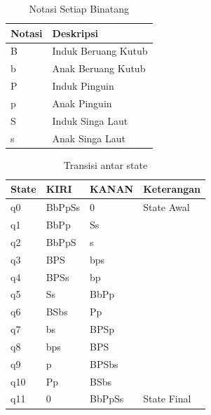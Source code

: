 \documentclass[12pt,a4paper]{article}
\begin{document}
\begin{table}[H]
\centering
\begin{tabular}{@{}ll@{}}
\toprule
\textbf{Notasi} & \textbf{Deskripsi} \\ \midrule
B & Induk Beruang Kutub \\
b & Anak Beruang Kutub \\
P & Induk Pinguin \\
p & Anak Pinguin \\
S & Induk Singa Laut \\
s & Anak Singa Laut \\ \bottomrule
\end{tabular}
\caption{Notasi Setiap Binatang}
\label{tab:notasi-binatang}
\end{table}

\begin{table}[h!]
\centering
\begin{tabular}{@{}llll@{}}
\toprule
\textbf{State} & \textbf{KIRI} & \textbf{KANAN} & \textbf{Keterangan} \\ \midrule
q0 & BbPpSs & 0        & State Awal    \\
q1 & BbPp   & Ss       &               \\
q2 & BbPpS  & s        &               \\
q3 & BPS    & bps      &               \\
q4 & BPSs   & bp       &               \\
q5 & Ss     & BbPp     &               \\
q6 & BSbs   & Pp       &               \\
q7 & bs     & BPSp     &               \\
q8 & bps    & BPS      &               \\
q9 & p      & BPSbs    &               \\
q10 & Pp    & BSbs     &               \\
q11 & 0     & BbPpSs   & State Final   \\ \bottomrule
\end{tabular}
\caption{Transisi antar state}
\end{table}

\newpage
\end{document}
